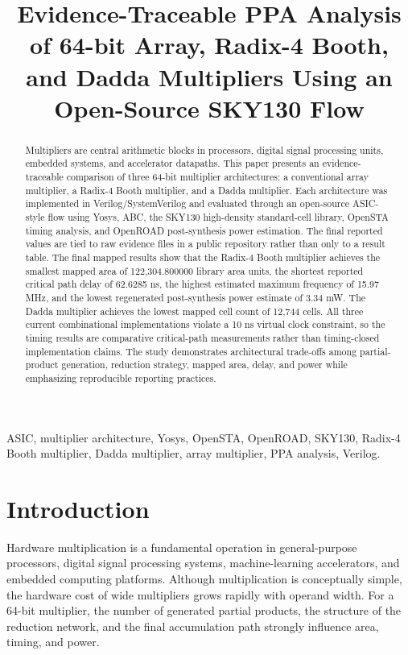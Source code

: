 \documentclass[conference]{IEEEtran}
\title{Evidence-Traceable PPA Analysis of 64-bit Array, Radix-4 Booth, and Dadda Multipliers Using an Open-Source SKY130 Flow}
\author{\IEEEauthorblockN{Nikhil Ramanathan}
\IEEEauthorblockA{Independent Undergraduate VLSI Project\\
SRM Institute of Science and Technology\\
Chennai, India}}
\begin{document}
\maketitle

\begin{abstract}
Multipliers are central arithmetic blocks in processors, digital signal processing units, embedded systems, and accelerator datapaths. This paper presents an evidence-traceable comparison of three 64-bit multiplier architectures: a conventional array multiplier, a Radix-4 Booth multiplier, and a Dadda multiplier. Each architecture was implemented in Verilog/SystemVerilog and evaluated through an open-source ASIC-style flow using Yosys, ABC, the SKY130 high-density standard-cell library, OpenSTA timing analysis, and OpenROAD post-synthesis power estimation. The final reported values are tied to raw evidence files in a public repository rather than only to a result table. The final mapped results show that the Radix-4 Booth multiplier achieves the smallest mapped area of 122,304.800000 library area units, the shortest reported critical path delay of 62.6285 ns, the highest estimated maximum frequency of 15.97 MHz, and the lowest regenerated post-synthesis power estimate of 3.34 mW. The Dadda multiplier achieves the lowest mapped cell count of 12,744 cells. All three current combinational implementations violate a 10 ns virtual clock constraint, so the timing results are comparative critical-path measurements rather than timing-closed implementation claims. The study demonstrates architectural trade-offs among partial-product generation, reduction strategy, mapped area, delay, and power while emphasizing reproducible reporting practices.
\end{abstract}

\begin{IEEEkeywords}
ASIC, multiplier architecture, Yosys, OpenSTA, OpenROAD, SKY130, Radix-4 Booth multiplier, Dadda multiplier, array multiplier, PPA analysis, Verilog.
\end{IEEEkeywords}

\section{Introduction}
Hardware multiplication is a fundamental operation in general-purpose processors, digital signal processing systems, machine-learning accelerators, and embedded computing platforms. Although multiplication is conceptually simple, the hardware cost of wide multipliers grows rapidly with operand width. For a 64-bit multiplier, the number of generated partial products, the structure of the reduction network, and the final accumulation path strongly influence area, timing, and power.
\end{document}
